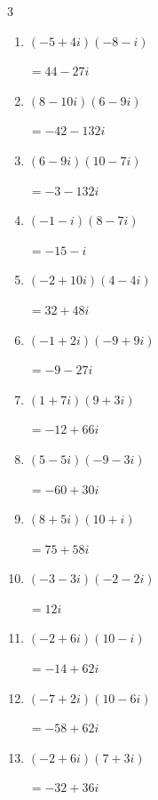 \begin{multicols}{3}
\begin{enumerate}
  \item $\displaystyle (-5+4i)(-8-i)$

        $\displaystyle =44-27i$

  \item $\displaystyle (8-10i)(6-9i)$

        $\displaystyle =-42-132i$

\columnbreak %

\resetques

  \item $\displaystyle (6-9i)(10-7i)$

        $\displaystyle =-3-132i$

  \item $\displaystyle (-1-i)(8-7i)$

        $\displaystyle =-15-i$

  \item $\displaystyle (-2+10i)(4-4i)$

        $\displaystyle =32+48i$

  \item $\displaystyle (-1+2i)(-9+9i)$

        $\displaystyle =-9-27i$

  \item $\displaystyle (1+7i)(9+3i)$

        $\displaystyle =-12+66i$

  \item $\displaystyle (5-5i)(-9-3i)$

        $\displaystyle =-60+30i$

  \item $\displaystyle (8+5i)(10+i)$

        $\displaystyle =75+58i$

  \item $\displaystyle (-3-3i)(-2-2i)$

        $\displaystyle =12i$

  \item $\displaystyle (-2+6i)(10-i)$

        $\displaystyle =-14+62i$

  \item $\displaystyle (-7+2i)(10-6i)$

        $\displaystyle =-58+62i$

  \item $\displaystyle (-2+6i)(7+3i)$

        $\displaystyle =-32+36i$


\end{enumerate}
\end{multicols}
